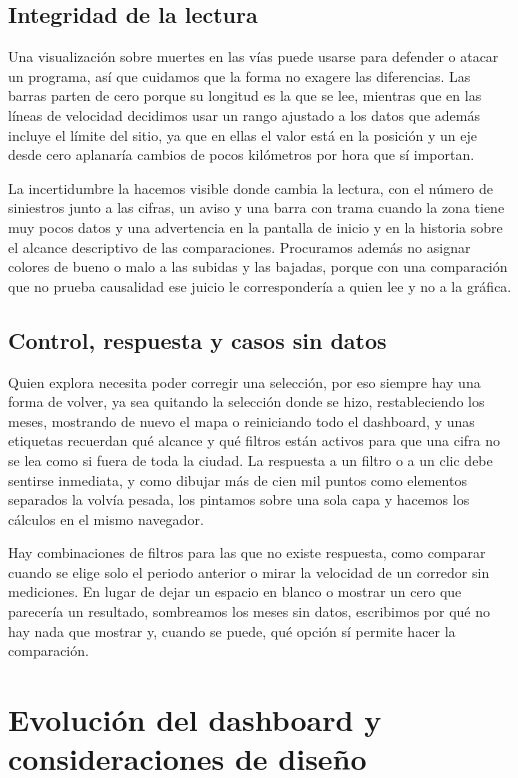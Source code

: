 \documentclass[10pt,a4paper]{article}
\begin{document}
\subsection{Integridad de la lectura}

Una visualización sobre muertes en las vías puede usarse para defender o atacar un programa, así que cuidamos que la forma no exagere las diferencias. Las barras parten de cero porque su longitud es la que se lee, mientras que en las líneas de velocidad decidimos usar un rango ajustado a los datos que además incluye el límite del sitio, ya que en ellas el valor está en la posición y un eje desde cero aplanaría cambios de pocos kilómetros por hora que sí importan.

La incertidumbre la hacemos visible donde cambia la lectura, con el número de siniestros junto a las cifras, un aviso y una barra con trama cuando la zona tiene muy pocos datos y una advertencia en la pantalla de inicio y en la historia sobre el alcance descriptivo de las comparaciones. Procuramos además no asignar colores de bueno o malo a las subidas y las bajadas, porque con una comparación que no prueba causalidad ese juicio le correspondería a quien lee y no a la gráfica.

\subsection{Control, respuesta y casos sin datos}

Quien explora necesita poder corregir una selección, por eso siempre hay una forma de volver, ya sea quitando la selección donde se hizo, restableciendo los meses, mostrando de nuevo el mapa o reiniciando todo el dashboard, y unas etiquetas recuerdan qué alcance y qué filtros están activos para que una cifra no se lea como si fuera de toda la ciudad. La respuesta a un filtro o a un clic debe sentirse inmediata, y como dibujar más de cien mil puntos como elementos separados la volvía pesada, los pintamos sobre una sola capa y hacemos los cálculos en el mismo navegador.

Hay combinaciones de filtros para las que no existe respuesta, como comparar cuando se elige solo el periodo anterior o mirar la velocidad de un corredor sin mediciones. En lugar de dejar un espacio en blanco o mostrar un cero que parecería un resultado, sombreamos los meses sin datos, escribimos por qué no hay nada que mostrar y, cuando se puede, qué opción sí permite hacer la comparación.

\section{Evolución del dashboard y consideraciones de diseño}
\end{document}
